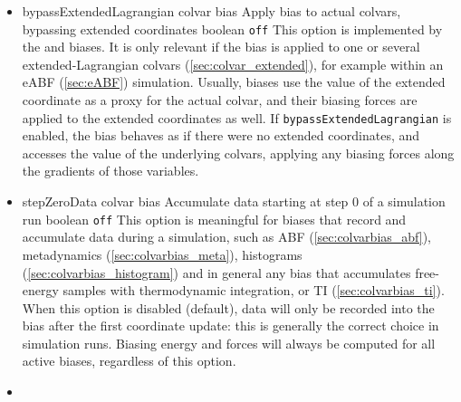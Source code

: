 \begin{itemize}
\item %
  \keydef
    {bypassExtendedLagrangian}{%
    colvar bias}{%
    Apply bias to actual colvars, bypassing extended coordinates}{%
    boolean}{%
    \texttt{off}}{%
    This option is implemented by the  and
     biases.
    It is only relevant if the bias is applied to one or several extended-Lagrangian colvars (\ref{sec:colvar_extended}),
    for example within an eABF (\ref{sec:eABF}) simulation.
    Usually, biases use the value of the extended coordinate as a proxy for the actual colvar, and their biasing forces are applied to the extended coordinates as well.
    If \texttt{bypassExtendedLagrangian} is enabled, the bias behaves as if there were no extended coordinates, and accesses the value of the underlying colvars, applying any biasing forces along the gradients of those variables.}

\item %
  \keydef
    {stepZeroData}{%
    colvar bias}{%
    Accumulate data starting at step 0 of a simulation run}{%
    boolean}{%
    \texttt{off}}{%
    This option is meaningful for biases that record and accumulate data during a simulation, such as ABF (\ref{sec:colvarbias_abf}), metadynamics (\ref{sec:colvarbias_meta}), histograms (\ref{sec:colvarbias_histogram}) and in general any bias that accumulates free-energy samples with thermodynamic integration, or TI (\ref{sec:colvarbias_ti}).
    When this option is disabled (default), data will only be recorded into the bias after the first coordinate update: this is generally the correct choice in simulation runs.
    Biasing energy and forces will always be computed for all active biases, regardless of this option.
  }

\item %


\end{itemize}

